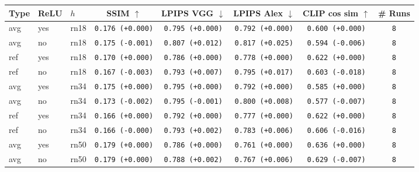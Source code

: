 \begin{tabular}{|l|l|l|c|c|c|c|c|}
\hline
Type & ReLU & $h$ & SSIM $\uparrow$ & LPIPS VGG $\downarrow$ & LPIPS Alex $\downarrow$ & CLIP cos sim $\uparrow$ & \# Runs \\
\hline
\rowcolor{verylightgray}avg & yes & rn18 & \texttt{0.176 {\color{black}(+0.000)}} & \texttt{0.795 {\color{black}(+0.000)}} & \texttt{0.792 {\color{black}(+0.000)}} & \texttt{0.600 {\color{black}(+0.000)}} & \texttt{8} \\
avg & no & rn18 & \texttt{0.175 {\color{red}(-0.001)}} & \texttt{0.807 {\color{red}(+0.012)}} & \texttt{0.817 {\color{red}(+0.025)}} & \texttt{0.594 {\color{red}(-0.006)}} & \texttt{8} \\
\hline
\rowcolor{verylightgray}ref & yes & rn18 & \texttt{0.170 {\color{black}(+0.000)}} & \texttt{0.786 {\color{black}(+0.000)}} & \texttt{0.778 {\color{black}(+0.000)}} & \texttt{0.622 {\color{black}(+0.000)}} & \texttt{8} \\
ref & no & rn18 & \texttt{0.167 {\color{red}(-0.003)}} & \texttt{0.793 {\color{red}(+0.007)}} & \texttt{0.795 {\color{red}(+0.017)}} & \texttt{0.603 {\color{red}(-0.018)}} & \texttt{8} \\
\hline
\rowcolor{verylightgray}avg & yes & rn34 & \texttt{0.175 {\color{black}(+0.000)}} & \texttt{0.795 {\color{black}(+0.000)}} & \texttt{0.792 {\color{black}(+0.000)}} & \texttt{0.585 {\color{black}(+0.000)}} & \texttt{8} \\
avg & no & rn34 & \texttt{0.173 {\color{red}(-0.002)}} & \texttt{0.795 {\color{green}(-0.001)}} & \texttt{0.800 {\color{red}(+0.008)}} & \texttt{0.577 {\color{red}(-0.007)}} & \texttt{8} \\
\hline
\rowcolor{verylightgray}ref & yes & rn34 & \texttt{0.166 {\color{black}(+0.000)}} & \texttt{0.792 {\color{black}(+0.000)}} & \texttt{0.777 {\color{black}(+0.000)}} & \texttt{0.622 {\color{black}(+0.000)}} & \texttt{8} \\
ref & no & rn34 & \texttt{0.166 {\color{black}(-0.000)}} & \texttt{0.793 {\color{red}(+0.002)}} & \texttt{0.783 {\color{red}(+0.006)}} & \texttt{0.606 {\color{red}(-0.016)}} & \texttt{8} \\
\hline
\rowcolor{verylightgray}avg & yes & rn50 & \texttt{0.179 {\color{black}(+0.000)}} & \texttt{0.786 {\color{black}(+0.000)}} & \texttt{0.761 {\color{black}(+0.000)}} & \texttt{0.636 {\color{black}(+0.000)}} & \texttt{8} \\
avg & no & rn50 & \texttt{0.179 {\color{black}(+0.000)}} & \texttt{0.788 {\color{red}(+0.002)}} & \texttt{0.767 {\color{red}(+0.006)}} & \texttt{0.629 {\color{red}(-0.007)}} & \texttt{8} \\

\end{tabular}
